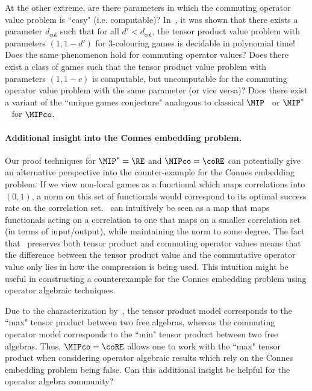 At the other extreme, are there parameters in which the commuting operator value problem is ``easy" (i.e. computable)? In~\cite{culfApproximationAlgorithmsNoncommutative2024}, it was shown that there exists a parameter $d_{\text{col}}$ such that for all $d' < d_{\text{col}}$, the tensor product value problem with parameters $(1, 1 - d')$ for 3-colouring games is decidable in polynomial time! Does the same phenomenon hold for commuting operator values? Does there exist a class of games such that the tensor product value problem with parameters $(1, 1-c)$ is computable, but uncomputable for the commuting operator value problem with the same parameter (or vice versa)? Does there exist a variant of the ``unique games conjecture" analogous to classical $\MIP$~\cite{khotPowerUnique2prover2002} or $\MIP^*$~\cite{kempeUniqueGamesEntangled2009, mousaviQuantumUniqueGames2024} for $\MIPco$. 


\paragraph{Additional insight into the Connes embedding problem. } Our proof techniques for $\MIP^*=\RE$ and $\MIPco =\coRE$ can potentially give an alternative perspective into the counter-example for the Connes embedding problem. If we view non-local games as a functional which maps correlations into $(0,1)$, a norm on this set of functionals would correspond to its optimal success rate on the correlation set.~ can intuitively be seen as a map that maps functionals acting on a correlation to one that maps on a smaller correlation set (in terms of input/output), while maintaining the norm to some degree. The fact that~ preserves both tensor product and commuting operator values means that the difference between the tensor product value and the commutative operator value only lies in how the compression is being used. This intuition might be useful in constructing a counterexample for the Connes embedding problem using operator algebraic techniques.

Due to the characterization by~\cite{fritzTsirelsonProblemKirchberg2012}, the tensor product model corresponds to the ``max" tensor product between two free algebras, whereas the commuting operator model corresponds to the ``min" tensor product between two free algebras. Thus, $\MIPco=\coRE$ allows one to work with the ``max" tensor product when considering operator algebraic results which rely on the Connes embedding problem being false. Can this additional insight be helpful for the operator algebra community? 

